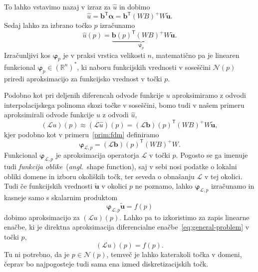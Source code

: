 \documentclass[12pt,a4paper,twoside]{article}
\theoremstyle{definition} %
\theoremstyle{plain} %
\numberwithin{equation}{section}
\newcommand{\R}{\mathbb R}
\newcommand{\Nc}{\mathcal{N}}
\renewcommand{\L}{\mathcal{L}}
\newcommand{\T}{\mathsf{T}}
\renewcommand{\b}{\boldsymbol}
\renewcommand{\phi}{\varphi}
\newcommand{\uh}{\hat{u}}
\newcommand{\ang}[1]{(\textit{angl.}\ #1)}
\begin{document}
To lahko vstavimo nazaj v izraz za $\hat{u}$ in dobimo
\begin{equation}
  \hat{u} = \b{b}^\T\b{\alpha} = \b{b}^\T(WB)^{+}W\b{\tilde{u}}.
\end{equation}
Sedaj lahko za izbrano točko $p$ izračunamo
\begin{equation}
   \hat{u}(p) = \underbrace{\b{b}(p)^\T(WB)^{+}W}_{\b\phi_p}\b{\tilde{u}}.
\end{equation}
Izračunljivi kos $\b\phi_p$ je v praksi vrstica velikosti $n$, matematično pa je
linearen funkcional $\b\phi_p \in (\R^n)^\ast$, ki naboru funkcijskih vrednosti v
soseščini $\Nc(p)$ priredi aproksimacijo za funkcijsko vrednost v točki $p$.

Podobno kot pri deljenih diferencah odvode funkcije $u$ aproksimiramo z odvodi
interpolacijskega polinoma skozi točke v soseščini, bomo tudi v našem primeru
aproksimirali odvode funkcije $u$ z odvodi $\uh$,
\begin{equation}
  (\L u)(p) \approx (\L \uh)(p) = (\L\b{b})(p)^\T(WB)^{+}W \b{\tilde{u}},
\end{equation}
kjer podobno kot v primeru~\ref{prim:fdm} definiramo
\begin{equation}
  \b\phi_{\L, p} = (\L\b{b})(p)^\T(WB)^{+}W.
  \label{eq:shape-definition}
\end{equation}
Funkcional $\b\phi_{\L, p}$ je aproksimacija operatorja $\L$ v točki $p$.
Pogosto se ga imenuje tudi \emph{funkcija oblike}~\ang{shape function}, saj v
sebi nosi podatke o lokalni obliki domene in izboru okoliških točk, ter seveda o
obnašanju $\L$ v tej okolici. Tudi če funkcijskih vrednosti $\b{\tilde{u}}$ v
okolici $p$ ne poznamo, lahko $\b\phi_{\L, p}$ izračunamo in kasneje samo s
skalarnim produktom \begin{equation}
   \b\phi_{\L, p} \b{\tilde{u}} = f(p)
\end{equation}
dobimo aproksimacijo za $(\L u)(p)$. Lahko pa to izkoristimo za zapis linearne enačbe,
ki je direktna aproksimacija diferencialne enačbe~\eqref{eq:general-problem} v točki $p$,
\begin{equation}
  \label{eq:discrete-approx-in-one-point}
   (\L u)(p) = f(p).
\end{equation}
Tu ni potrebno, da je $p \in \Nc(p)$, temveč je lahko katerakoli točka v domeni, čeprav bo
najpogosteje tudi sama ena izmed diskretizacijskih točk.
\end{document}
